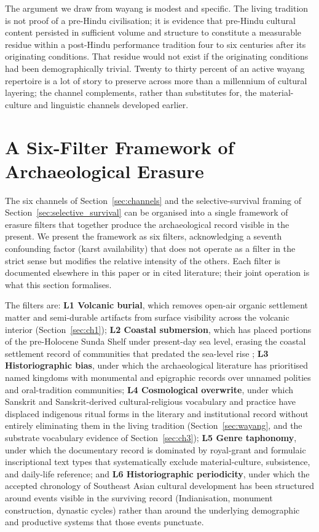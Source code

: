 \documentclass[12pt,a4paper]{article}
\begin{document}
The argument we draw from wayang is modest and specific. The living tradition is not proof of a pre-Hindu civilisation; it is evidence that pre-Hindu cultural content persisted in sufficient volume and structure to constitute a measurable residue within a post-Hindu performance tradition four to six centuries after its originating conditions. That residue would not exist if the originating conditions had been demographically trivial. Twenty to thirty percent of an active wayang repertoire is a lot of story to preserve across more than a millennium of cultural layering; the channel complements, rather than substitutes for, the material-culture and linguistic channels developed earlier.


\section{A Six-Filter Framework of Archaeological Erasure}
\label{sec:layers}

The six channels of Section~\ref{sec:channels} and the selective-survival framing of Section~\ref{sec:selective_survival} can be organised into a single framework of erasure filters that together produce the archaeological record visible in the present. We present the framework as six filters, acknowledging a seventh confounding factor (karst availability) that does not operate as a filter in the strict sense but modifies the relative intensity of the others. Each filter is documented elsewhere in this paper or in cited literature; their joint operation is what this section formalises.

The filters are: \textbf{L1 Volcanic burial}, which removes open-air organic settlement matter and semi-durable artifacts from surface visibility across the volcanic interior (Section~\ref{sec:ch1}); \textbf{L2 Coastal submersion}, which has placed portions of the pre-Holocene Sunda Shelf under present-day sea level, erasing the coastal settlement record of communities that predated the sea-level rise \citep{oppenheimer1998}; \textbf{L3 Historiographic bias}, under which the archaeological literature has prioritised named kingdoms with monumental and epigraphic records over unnamed polities and oral-tradition communities; \textbf{L4 Cosmological overwrite}, under which Sanskrit and Sanskrit-derived cultural-religious vocabulary and practice have displaced indigenous ritual forms in the literary and institutional record without entirely eliminating them in the living tradition (Section~\ref{sec:wayang}, and the substrate vocabulary evidence of Section~\ref{sec:ch3}); \textbf{L5 Genre taphonomy}, under which the documentary record is dominated by royal-grant and formulaic inscriptional text types that systematically exclude material-culture, subsistence, and daily-life reference; and \textbf{L6 Historiographic periodicity}, under which the accepted chronology of Southeast Asian cultural development has been structured around events visible in the surviving record (Indianisation, monument construction, dynastic cycles) rather than around the underlying demographic and productive systems that those events punctuate.
\end{document}
